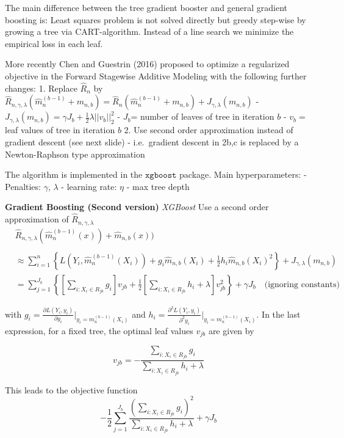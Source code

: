 \documentclass[
]{book}
\begin{document}
The main difference between the tree gradient booster and general gradient boosting is: Least squares problem is not solved directly but greedy step-wise by growing a tree via CART-algorithm. Instead of a line search we minimize the empirical loss in each leaf.

More recently Chen and Guestrin (2016) proposed to optimize a regularized objective in the Forward Stagewise Additive Modeling with the following further changes:
1. Replace \(\hat R_n\) by \(\hat R_{n,\gamma,\lambda}(\hat m_n^{(b-1)}+m_{n,b}) =\hat R_n(\hat m_n^{(b-1)}+m_{n,b}) + J_{\gamma,\lambda}(m_{n,b})\)
- \(J_{\gamma,\lambda}(m_{n,b})= \gamma J_b+ \frac 1 2 \lambda ||v_b||_2^2\)
- \(J_b\)= number of leaves of tree in iteration \(b\)
- \(v_b=\) leaf values of tree in iteration \(b\)
2. Use second order approximation instead of gradient descent (see next slide)
- i.e.~gradient descent in 2b,c is replaced by a Newton-Raphson type approximation

The algorithm is implemented in the \(\texttt{xgboost}\) package. Main hyperparameters:
- Penalties: \(\gamma\), \(\lambda\)
- learning rate: \(\eta\)
- max tree depth

\textbf{Gradient Boosting (Second version)} \emph{XGBoost} Use a second order approximation of \(\hat R_{n,\gamma,\lambda}\)
\begin{align}
&\hat R_{n,\gamma,\lambda}(\hat m_n^{(b-1)}(x))+\hat m_{n,b}(x))\\
\\&\approx\sum_{i=1}^n \left\{ L(Y_i,\hat 
m_n^{(b-1)}(X_i))+ g_i\hat m_{n,b}(X_i)+ \frac 1 2 h_i \hat m_{n,b}(X_i)^2\right \}+ J_{\gamma,\lambda}(m_{n,b})\\
&= \sum_{j=1}^{J_b}\left \{ \left[\sum_{i: X_i \in R_{jb}}g_i\right]v_{jb} + \frac 1 2 \left[\sum_{i: X_i \in R_{jb}}h_i+\lambda\right]v_{jb}^2 \right\}+\gamma J_b \quad \text{(ignoring constants)}
\end{align}

with \(g_i= \frac{\partial L(Y_i,y_i)}{\partial y_i} \Bigr\rvert_{y_i=m_n^{(b-1)}(X_i)}\) and \(h_i= \frac{\partial^2 L(Y_i,y_i)}{\partial^2 y_i} \Bigr\rvert_{y_i=m_n^{(b-1)}(X_i)}\). In the last expression, for a fixed tree, the optimal leaf values \(v_{jb}\) are given by

\[
v_{jb}=-\frac{\sum_{i: X_i \in R_{jb}} g_i }{\sum_{i: X_i \in R_{jb}} h_i+\lambda}
\]

This leads to the objective function
\[
-\frac 1 2\sum_{j=1}^{J_b} \frac {(\sum_{i: X_i \in R_{jb}}g_i)^2}{\sum_{i: X_i \in R_{jb}}h_i+\lambda}+\gamma J_b
\]
\end{document}
